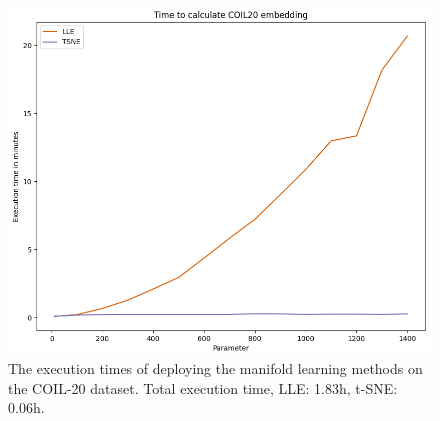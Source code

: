 \begin{figure}[!]
	\centering
	\includegraphics[width=0.80\columnwidth]{images/drONcoil.png}
	\caption[DR on COÌL-20]{The execution times of deploying the manifold learning methods on the COIL-20 dataset. Total execution time, \textcolor{lle}{LLE: 1.83h}, \textcolor{tsne}{t-SNE: 0.06h}.}
    \label{fig:drONcoil}
\end{figure}